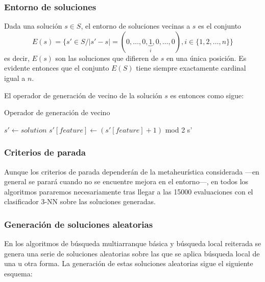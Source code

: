 \documentclass[a4paper, 11pt, titlepage]{article}
\begin{document}
    \subsubsection*{Entorno de soluciones}
    Dada una solución $s \in S$, el entorno de soluciones vecinas a $s$ es el conjunto
    \[
    E(s) = \{s' \in S / \vert s' - s \vert = (0, \dots, 0, \underbrace{1}_i, 0, \dots, 0), i\in\{1,2, \dots, n\}\}
    \]
    es decir, $E(s)$ son las soluciones que difieren de $s$ en una única posición. Es evidente entonces que el conjunto $E(S)$ tiene siempre exactamente cardinal igual a $n$.

    El operador de generación de vecino de la solución $s$ es entonces como sigue:
    \begin{algorithm}
        \caption{Operador de generación de vecino}\label{flip}
        \begin{algorithmic}[1]
            \State $s' \gets solution$
            \State $s'[feature] \gets (s'[feature] + 1)$ mod 2
            \State \Return s'
            \EndFunction
        \end{algorithmic}
    \end{algorithm}



    \subsubsection*{Criterios de parada}
    Aunque los criterios de parada dependerán de la metaheurística considerada ---en general se parará cuando no se encuentre mejora en el entorno---, en todos los algoritmos pararemos necesariamente tras llegar a las 15000 evaluaciones con el clasificador 3-NN sobre las soluciones generadas.

    \subsubsection*{Generación de soluciones aleatorias}

    En los algoritmos de búsqueda multiarranque básica y búsqueda local reiterada se genera una serie de soluciones aleatorias sobre las que se aplica búsqueda local de una u otra forma. La generación de estas soluciones aleatorias sigue el siguiente esquema:
\end{document}

